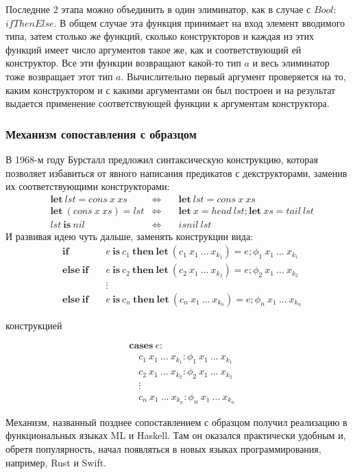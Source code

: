 Последние 2 этапа можно объединить в один элиминатор, как в случае с \(Bool\):
\(ifThenElse\). В общем случае эта функция принимает на вход элемент вводимого
типа, затем столько же функций, сколько конструкторов и каждая из этих функций
имеет число аргументов такое же, как и соответствующий ей конструктор. Все эти
функции возвращают какой-то тип \(a\) и весь элиминатор тоже возвращает этот тип \(a\).
Вычислительно первый аргумент проверяется на то, каким конструктором и с какими
аргументами он был построен и на результат выдается применение соответствующей
функции к аргументам конструктора.

\subsubsection{Механизм сопоставления с образцом}\label{pattern-matching}

В 1968-м году Бурсталл \cite{proving-properties-of-programs-by-structural-induction}
предложил синтаксическую конструкцию, которая позволяет избавиться от явного написания
предикатов с декструкторами, заменив их соответствующими конструкторами:
\begin{align*}
&\mathbf{let}\ lst = cons\ x\ xs &\Leftrightarrow &\quad\mathbf{let}\ lst = cons\ x\ xs\\
&\mathbf{let}\ (cons\ x\ xs) = lst &\Leftrightarrow
   &\quad\mathbf{let}\ x = head\ lst; \mathbf{let}\ xs = tail\ lst\\
&lst\ \mathbf{is}\ nil &\Leftrightarrow &\quad isnil\ lst
\end{align*}
И развивая идею чуть дальше, заменять конструкции вида:
\begin{align*}
&\mathbf{if}\ &&e\ \mathbf{is}\ c_1\ \mathbf{then\ let}\ (c_1\ x_1\ \dots\ x_{k_1}) = e;
   \phi_1\ x_1\ \dots\ x_{k_1}\\
&\mathbf{else\ if}\ &&e\ \mathbf{is}\ c_2\ \mathbf{then\ let}\ (c_2\ x_1\ \dots\ x_{k_2}) = e;
   \phi_2\ x_1\ \dots\ x_{k_2}\\
&&&\vdots\\
&\mathbf{else\ if}\ &&e\ \mathbf{is}\ c_n\ \mathbf{then\ let}\ (c_n\ x_1\ \dots\ x_{k_n}) = e;
   \phi_n\ x_1\ \dots\ x_{k_n}
\end{align*}

конструкцией

\begin{align*}
&\mathbf{cases}\ e:\\
&\quad c_1\ x_1\ \dots\ x_{k_1}: \phi_1\ x_1\ \dots\ x_{k_1}\\
&\quad c_2\ x_1\ \dots\ x_{k_2}: \phi_2\ x_1\ \dots\ x_{k_2}\\
&\quad\vdots\\
&\quad c_n\ x_1\ \dots\ x_{k_n}: \phi_n\ x_1\ \dots\ x_{k_n}
\end{align*}

Механизм, названный позднее сопоставлением с образцом получил реализацию в
функциональных языках ML и Haskell. Там он оказался практически
удобным и, обретя популярность, начал появляться в новых языках программирования,
например, Rust и Swift.
